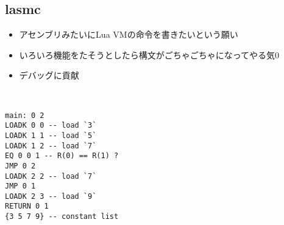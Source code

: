 \subsection{lasmc}
\begin{frame}[fragile]
	\frametitlesubs

	\begin{minipage}[t]{.58\textwidth}
		\begin{itemize}
			\item アセンブリみたいにLua VMの命令を書きたいという願い
			\item いろいろ機能をたそうとしたら構文がごちゃごちゃになってやる気0
			\item {}デバッグに貢献
		\end{itemize}
	\end{minipage}
	\begin{minipage}{.03\textwidth}
		\ 
	\end{minipage}
	\begin{minipage}[t]{.33\textwidth}
		\bgroup\scriptsize
		\begin{lstlisting}[numbers=none]
main: 0 2
LOADK 0 0 -- load `3`
LOADK 1 1 -- load `5`
LOADK 1 2 -- load `7`
EQ 0 0 1 -- R(0) == R(1) ?
JMP 0 2
LOADK 2 2 -- load `7`
JMP 0 1
LOADK 2 3 -- load `9`
RETURN 0 1
{3 5 7 9} -- constant list
		\end{lstlisting}
		\egroup
	\end{minipage}
\end{frame}
